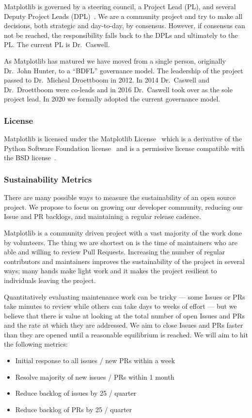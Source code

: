 \documentclass[12pt]{article}
\numberwithin{page}{section}
\begin{document}
Matplotlib is governed by a steering council, a Project Lead (PL), and
several Deputy Project Leads (DPL)~\cite{gov}.  We are a community
project and try to make all decisions, both strategic and day-to-day,
by consensus.  However, if consensus can not be reached, the
responsibility falls back to the DPLs and ultimately to the PL.  The
current PL is Dr.\ Caswell.

As Matplotlib has matured we have moved from a single person,
originally Dr.\ John Hunter, to a ``BDFL'' governance model.  The
leadership of the project passed to Dr.\ Micheal Droettboom in 2012.
In 2014 Dr.\ Caswell and Dr.\ Droettboom were co-leads and in 2016
Dr.\ Caswell took over as the sole project lead.  In 2020 we formally
adopted the current governance model.

\subsubsection{License}

Matplotlib is licensed under the Matplotlib License~\cite{mpl_lic}
which is a derivative of the Python Software Foundation
license~\cite{psf_lic} and is a permissive license compatible with the
BSD license~\cite{jdh_bsd_opinions}.


\subsubsection{Sustainability Metrics}

There are many possible ways to measure the sustainability of an
open source project.  We propose to focus on growing our developer
community, reducing our Issue and PR backlogs, and maintaining a
regular release cadence.

Matplotlib is a community driven project with a vast majority of the
work done by volunteers.  The thing we are shortest on is the time of
maintainers who are able and willing to review Pull Requests.
Increasing the number of regular contributors and maintainers improves
the sustainability of the project in several ways; many hands make
light work and it makes the project resilient to individuals leaving
the project.

Quantitatively evaluating maintenance work can be tricky --- some
Issues or PRs take minutes to review while others can take days to
weeks of effort --- but we believe that there is value at looking at
the total number of open Issues and PRs and the rate at which they are
addressed.  We aim to close Issues and PRs faster than they are opened
until a reasonable equilibrium is reached.  We will aim to hit the
following metrics:
\begin{itemize}[noitemsep]
\item Initial response to all issues / new PRs within a week
\item Resolve majority of new issues / PRs within 1 month
\item Reduce backlog of issues by 25 / quarter
\item Reduce backlog of PRs by 25 / quarter
\end{itemize}
\end{document}
